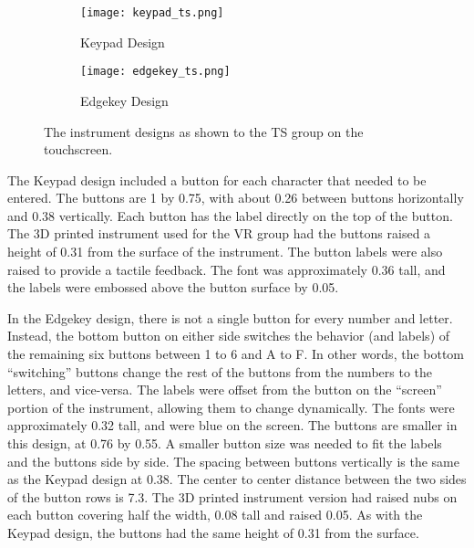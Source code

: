 \begin{figure}
    \centering
    \begin{subfigure}[t]{0.95\linewidth}
        \centering
        \texttt{[image: keypad\_ts.png]}
        \caption{Keypad Design}
        \label{fig:de_ts_instrument:keypad}
    \end{subfigure}
    \begin{subfigure}[t]{0.95\linewidth}
        \centering
        \texttt{[image: edgekey\_ts.png]}
        \caption{Edgekey Design}
        \label{fig:de_ts_instrument:edgekey}
    \end{subfigure}
    \caption{The instrument designs as shown to the TS group on the touchscreen.}
    \label{fig:de_ts_instrument}
\end{figure}

The Keypad design included a button for each character that needed to be entered.
The buttons are \SI{1}{\inch} by \SI{0.75}{\inch}, with about \SI{0.26}{\inch} between buttons horizontally and \SI{0.38}{\inch} vertically.
Each button has the label directly on the top of the button.
The 3D printed instrument used for the VR group had the buttons raised a height of \SI{0.31}{\inch} from the surface of the instrument.
The button labels were also raised to provide a tactile feedback.
The font was approximately \SI{0.36}{\inch} tall, and the labels were embossed above the button surface by \SI{0.05}{\inch}.

In the Edgekey design, there is not a single button for every number and letter.
Instead, the bottom button on either side switches the behavior (and labels) of the remaining six buttons between 1 to 6 and A to F.
In other words, the bottom ``switching'' buttons change the rest of the buttons from the numbers to the letters, and vice-versa.
The labels were offset from the button on the ``screen'' portion of the instrument, allowing them to change dynamically.
The fonts were approximately \SI{0.32}{\inch} tall, and were blue on the screen.
The buttons are smaller in this design, at \SI{0.76}{\inch} by \SI{0.55}{\inch}.
A smaller button size was needed to fit the labels and the buttons side by side.
The spacing between buttons vertically is the same as the Keypad design at \SI{0.38}{\inch}.
The center to center distance between the two sides of the button rows is \SI{7.3}{\inch}.
The 3D printed instrument version had raised nubs on each button covering half the width, \SI{0.08}{\inch} tall and raised \SI{0.05}{\inch}.
As with the Keypad design, the buttons had the same height of \SI{0.31}{\inch} from the surface.

